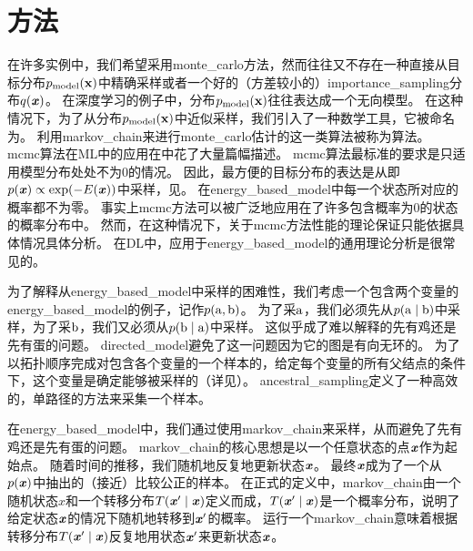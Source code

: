 \section{方法}
\label{sec:markov_chain_monte_carlo_methods}

在许多实例中，我们希望采用\gls{monte_carlo}方法，然而往往又不存在一种直接从目标分布$p_{\text{model}}(\mathbf{x})$中精确采样或者一个好的（方差较小的）\gls{importance_sampling}分布$q(\boldsymbol{\mathit{x}})$。
在深度学习的例子中，分布$p_{\text{model}}(\mathbf{x})$往往表达成一个无向模型。
在这种情况下，为了从分布$p_{\text{model}}(\mathbf{x})$中近似采样，我们引入了一种数学工具，它被命名为。
利用\gls{markov_chain}来进行\gls{monte_carlo}估计的这一类算法被称为算法。
\gls{mcmc}算法在\gls{ML}中的应用在\citet{koller-book2009}中花了大量篇幅描述。
\gls{mcmc}算法最标准的要求是只适用模型分布处处不为0的情况。
因此，最方便的目标分布的表达是从即$p(\boldsymbol{\mathit{x}})\propto \exp(-E(\boldsymbol{\mathit{x}}))$中采样，见。
在\gls{energy_based_model}中每一个状态所对应的概率都不为零。
事实上\gls{mcmc}方法可以被广泛地应用在了许多包含概率为0的状态的概率分布中。
然而，在这种情况下，关于\gls{mcmc}方法性能的理论保证只能依据具体情况具体分析。
在\gls{DL}中，应用于\gls{energy_based_model}的通用理论分析是很常见的。


为了解释从\gls{energy_based_model}中采样的困难性，我们考虑一个包含两个变量的\gls{energy_based_model}的例子，记作$p(\mathrm{a},\mathrm{b})$。
为了采$\mathrm{a}$，我们必须先从$p(\mathrm{a}\mid \mathrm{b})$中采样，为了采$\mathrm{b}$，我们又必须从$p(\mathrm{b}\mid \mathrm{a})$中采样。
这似乎成了难以解释的先有鸡还是先有蛋的问题。
\gls{directed_model}避免了这一问题因为它的图是有向无环的。
为了以拓扑顺序完成对包含各个变量的一个样本的，给定每个变量的所有父结点的条件下，这个变量是确定能够被采样的（详见）。
\gls{ancestral_sampling}定义了一种高效的，单路径的方法来采集一个样本。


在\gls{energy_based_model}中，我们通过使用\gls{markov_chain}来采样，从而避免了先有鸡还是先有蛋的问题。
\gls{markov_chain}的核心思想是以一个任意状态的点$\boldsymbol{\mathit{x}}$作为起始点。
随着时间的推移，我们随机地反复地更新状态$\boldsymbol{\mathit{x}}$。
最终$\boldsymbol{\mathit{x}}$成为了一个从$p(\boldsymbol{\mathit{x}})$中抽出的（接近）比较公正的样本。
在正式的定义中，\gls{markov_chain}由一个随机状态$x$和一个转移分布$T(\boldsymbol{\mathit{x}}'\mid \boldsymbol{\mathit{x}})$定义而成，$T(\boldsymbol{\mathit{x}}'\mid \boldsymbol{\mathit{x}})$是一个概率分布，说明了给定状态$\boldsymbol{\mathit{x}}$的情况下随机地转移到$\boldsymbol{\mathit{x}}'$的概率。
运行一个\gls{markov_chain}意味着根据转移分布$T(\boldsymbol{\mathit{x}}'\mid \boldsymbol{\mathit{x}})$反复地用状态$\boldsymbol{\mathit{x}}'$来更新状态$\boldsymbol{\mathit{x}}$。



